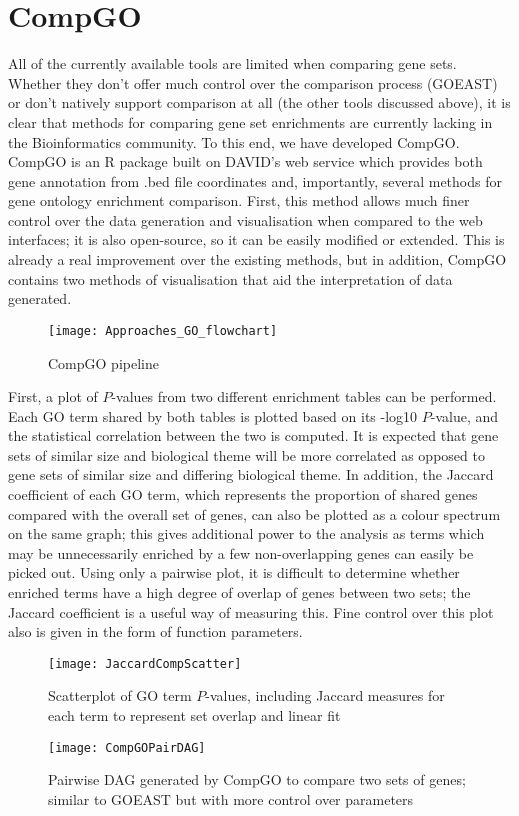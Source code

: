 \documentclass[11pt, oneside]{article}
\begin{document}
\section*{CompGO}
All of the currently available tools are limited when comparing gene sets. Whether they don't offer much control over the comparison process (GOEAST) or don't natively support comparison at all (the other tools discussed above), it is clear that methods for comparing gene set enrichments are currently lacking in the Bioinformatics community. To this end, we have developed CompGO. CompGO is an R package built on DAVID's web service which provides both gene annotation from .bed file coordinates and, importantly, several methods for gene ontology enrichment comparison. First, this method allows much finer control over the data generation and visualisation when compared to the web interfaces; it is also open-source, so it can be easily modified or extended. This is already a real improvement over the existing methods, but in addition, CompGO contains two methods of visualisation that aid the interpretation of data generated.\\
\begin{figure}[h!]
	\centering
	\texttt{[image: Approaches\_GO\_flowchart]}
	\caption{CompGO pipeline}
\end{figure}

First, a plot of $P$-values from two different enrichment tables can be performed. Each GO term shared by both tables is plotted based on its -log10 $P$-value, and the statistical correlation between the two is computed. It is expected that gene sets of similar size and biological theme will be more correlated as opposed to gene sets of similar size and differing biological theme. In addition, the Jaccard coefficient of each GO term, which represents the proportion of shared genes compared with the overall set of genes, can also be plotted as a colour spectrum on the same graph; this gives additional power to the analysis as terms which may be unnecessarily enriched by a few non-overlapping genes can easily be picked out. Using only a pairwise plot, it is difficult to determine whether enriched terms have a high degree of overlap of genes between two sets; the Jaccard coefficient is a useful way of measuring this. Fine control over this plot also is given in the form of function parameters.\\
\begin{figure}[ht]
\centering
\begin{minipage}{.4\textwidth}
	\centering
	\texttt{[image: JaccardCompScatter]}
	\caption{Scatterplot of GO term $P$-values, including Jaccard measures for each term to represent set overlap and linear fit}
\end{minipage}%
\qquad
\qquad
\begin{minipage}{.4\textwidth}
	\centering
	\texttt{[image: CompGOPairDAG]}
	\caption{Pairwise DAG generated by CompGO to compare two sets of genes; similar to GOEAST but with more control over parameters}
\end{minipage}
\end{figure}
\end{document}
